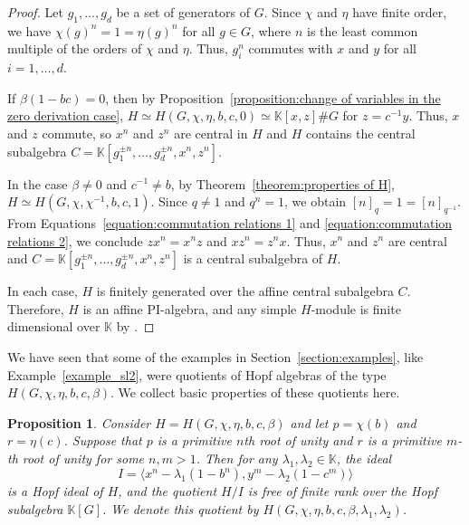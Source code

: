 \documentclass[11pt, twoside]{amsart}
\newtheorem{proposition}[theorem]{Proposition}
\theoremstyle{definition}
\newcommand{\KK}{\mathbb{K}}
\begin{document}
\begin{proof}
    Let $g_1, \ldots, g_d$ be a set of generators of $G$. Since $\chi$ and $\eta$ have finite order, we have $\chi(g)^{n} = 1 = \eta(g)^n$ for all $g \in G$, where $n$ is the least common multiple of the orders of $\chi$ and $\eta$. Thus, $g_{i}^{n}$ commutes with $x$ and $y$ for all $i = 1, \ldots, d$. 

    If $\beta(1-bc)=0$, then by Proposition~\ref{proposition:change of variables in the zero derivation case}, $H \simeq H(G, \chi, \eta, b, c, 0) \simeq \KK[x, z]\# G$ for $z = c^{-1}y$. Thus, $x$ and $z$ commute, so $x^n$ and $z^n$ are central in $H$ and $H$ contains the central subalgebra $C = \KK[g_{1}^{\pm n}, \ldots, g_{d}^{\pm n}, x^n, z^n]$. 

    In the case $\beta \neq 0$ and $c^{-1} \neq b$, by Theorem~\ref{theorem:properties of H}, $H \simeq H(G, \chi, \chi^{-1}, b, c, 1)$. 
    Since $q\neq 1$ and $q^n=1$, we obtain $[n]_q=1=[n]_{q^{-1}}$. From Equations~\eqref{equation:commutation relations 1} and \eqref{equation:commutation relations 2}, we conclude $zx^n = x^nz$ and $xz^n = z^nx$. Thus, $x^n$ and $z^n$ are central and  $C = \KK[g_{1}^{\pm n}, \ldots, g_{d}^{\pm n}, x^n, z^n]$ is a central subalgebra of $H$.

    In each case, $H$ is finitely generated over the affine central subalgebra $C$. Therefore, $H$ is an affine PI-algebra, and any simple $H$-module is finite dimensional over $\KK$ by \cite[13.10.3]{McConnell-Robson}.
\end{proof}
%
We have seen that some of the examples in Section~\ref{section:examples}, like Example~\ref{example_sl2}, were quotients of Hopf algebras of the type $H(G, \chi, \eta, b, c, \beta)$. We collect basic properties of these quotients here.

\begin{proposition}\label{proposition:hopf algebra quotients}
    Consider $H = H(G, \chi, \eta, b, c, \beta)$ and let $p = \chi(b)$ and $r = \eta(c)$. Suppose that $p$ is a primitive $n$th root of unity and $r$ is a primitive $m$-th root of unity for some $n, m > 1$. Then for any $\lambda_1, \lambda_2 \in \KK$, the ideal 
    \[I = \langle x^n - \lambda_1 (1 - b^n), y^m - \lambda_2 (1 - c^m) \rangle\]
    is a Hopf ideal of $H$, and the quotient $H/I$ is free of finite rank over the Hopf subalgebra $\KK[G]$. We denote this quotient by $H(G, \chi, \eta, b, c, \beta, \lambda_1, \lambda_2)$.
\end{proposition}
\end{document}
